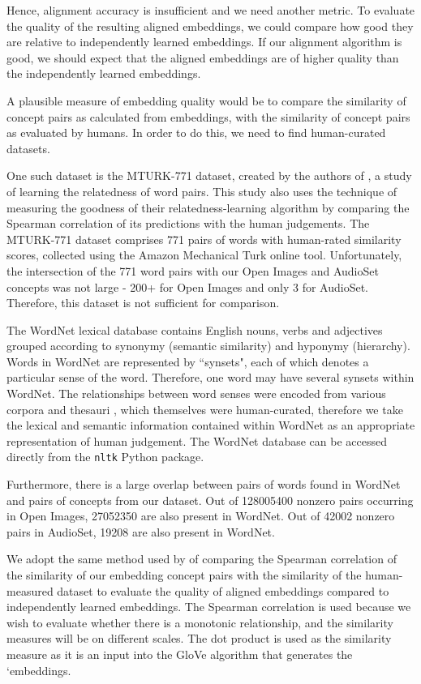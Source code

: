 Hence, alignment accuracy is insufficient and we need another metric. To evaluate the quality of the resulting aligned embeddings, we could compare how good they are relative to independently learned embeddings. If our alignment algorithm is good, we should expect that the aligned embeddings are of higher quality than the independently learned embeddings. 

A plausible measure of embedding quality would be to compare the similarity of concept pairs as calculated from embeddings, with the similarity of concept pairs as evaluated by humans. In order to do this, we need to find human-curated datasets.

One such dataset is the MTURK-771 dataset, created by the authors of \cite{mturk771}, a study of learning the relatedness of word pairs. This study also uses the technique of measuring the goodness of their relatedness-learning algorithm by comparing the Spearman correlation of its predictions with the human judgements. The MTURK-771 dataset comprises 771 pairs of words with human-rated similarity scores, collected using the Amazon Mechanical Turk online tool. Unfortunately, the intersection of the 771 word pairs with our Open Images and AudioSet concepts was not large - 200+  for Open Images and only 3 for AudioSet. Therefore, this dataset is not sufficient for comparison. 

The WordNet \cite{WordNet} lexical database contains English nouns, verbs and adjectives grouped according to synonymy (semantic similarity) and hyponymy (hierarchy). Words in WordNet are represented by ``synsets", each of which denotes a particular sense of the word. Therefore, one word may have several synsets within WordNet. The relationships between word senses were encoded from various corpora and thesauri , which themselves were human-curated, therefore we take the lexical and semantic information contained within WordNet as an appropriate representation of human judgement. The WordNet database can be accessed directly from the \texttt{nltk} Python package. 

Furthermore, there is a large overlap between pairs of words found in WordNet and pairs of concepts from our dataset.  Out of 128005400 nonzero pairs occurring in Open Images, 27052350 are also present in WordNet. Out of 42002 nonzero pairs in AudioSet, 19208 are also present in WordNet. 

We adopt the same method used by \cite{mturk771} of comparing the Spearman correlation of the similarity of our embedding concept pairs with the similarity of the human-measured dataset to evaluate the quality of aligned embeddings compared to independently learned embeddings. The Spearman correlation is used because we wish to evaluate whether there is a monotonic relationship, and the similarity measures will be on different scales. The dot product is used as the similarity measure as it is an input into the GloVe algorithm that generates the `embeddings.

